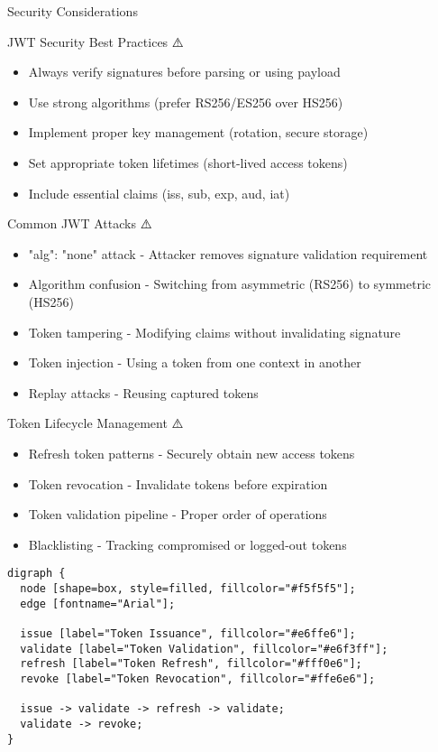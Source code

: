 \documentclass[presentation,aspectratio=169]{beamer}
\begin{document}
\begin{frame}[label={sec:org3f2080a},fragile]{Security Considerations}
 \begin{block}{JWT Security Best Practices ⚠️}
\begin{itemize}[<+->]
\item \alert{Always verify signatures before parsing or using payload}
\item Use strong algorithms (prefer RS256/ES256 over HS256)
\item Implement proper key management (rotation, secure storage)
\item Set appropriate token lifetimes (short-lived access tokens)
\item Include essential claims (iss, sub, exp, aud, iat)
\end{itemize}
\end{block}
\begin{block}{Common JWT Attacks ⚠️}
\begin{itemize}[<+->]
\item \alert{"alg": "none" attack} - Attacker removes signature validation requirement
\item \alert{Algorithm confusion} - Switching from asymmetric (RS256) to symmetric (HS256)
\item \alert{Token tampering} - Modifying claims without invalidating signature
\item \alert{Token injection} - Using a token from one context in another
\item \alert{Replay attacks} - Reusing captured tokens
\end{itemize}
\end{block}
\begin{block}{Token Lifecycle Management ⚠️}
\begin{itemize}[<+->]
\item \alert{Refresh token patterns} - Securely obtain new access tokens
\item \alert{Token revocation} - Invalidate tokens before expiration
\item \alert{Token validation pipeline} - Proper order of operations
\item \alert{Blacklisting} - Tracking compromised or logged-out tokens
\end{itemize}

\begin{verbatim}
digraph {
  node [shape=box, style=filled, fillcolor="#f5f5f5"];
  edge [fontname="Arial"];

  issue [label="Token Issuance", fillcolor="#e6ffe6"];
  validate [label="Token Validation", fillcolor="#e6f3ff"];
  refresh [label="Token Refresh", fillcolor="#fff0e6"];
  revoke [label="Token Revocation", fillcolor="#ffe6e6"];

  issue -> validate -> refresh -> validate;
  validate -> revoke;
}
\end{verbatim}
\end{block}
\end{frame}
\end{document}
